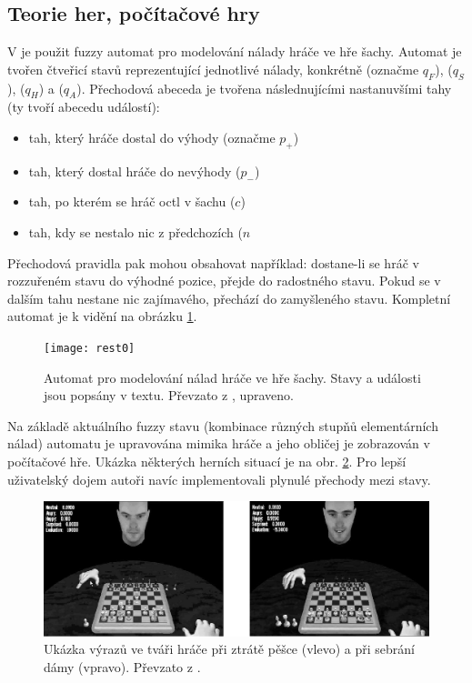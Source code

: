 \documentclass[a4paper,10pt]{article}
\begin{document}
\subsection{Teorie her, počítačové hry}
V \cite{AlvJoaCru-FuStMaAppEmoModEleGamCha} je použit fuzzy automat pro modelování nálady hráče ve hře šachy. Automat je tvořen čtveřicí stavů reprezentující jednotlivé  nálady, konkrétně  (označme $q_F$),  ($q_S$),  ($q_H$) a  ($q_A$). Přechodová abeceda je tvořena následnujícími nastanuvšími tahy (ty tvoří abecedu událostí):
\begin{itemize}
 \item tah, který hráče dostal do výhody (označme $p_{+}$)
 \item tah, který dostal hráče do nevýhody ($p_{-}$)
 \item tah, po kterém se hráč octl v šachu ($c$)
 \item tah, kdy se nestalo nic z předchozích ($n$
\end{itemize}

Přechodová pravidla pak mohou obsahovat například: dostane-li se hráč v rozzuřeném stavu do výhodné pozice, přejde do radostného stavu. Pokud se v dalším tahu nestane nic zajímavého, přechází do zamyšleného stavu. Kompletní automat je k vidění na obrázku \ref{img:ChessEmosFA}.

\begin{figure}
 \centering
 \texttt{[image: rest0]}
 
 \caption{Automat pro modelování nálad hráče ve hře šachy. Stavy a události jsou popsány v textu. Převzato z \cite{AlvJoaCru-FuStMaAppEmoModEleGamCha}, upraveno.}
 \label{img:ChessEmosFA}
\end{figure}

Na základě aktuálního fuzzy stavu (kombinace různých stupňů elementárních nálad) automatu je upravována mimika hráče a jeho obličej je zobrazován v počítačové hře. Ukázka některých herních situací je na obr. \ref{img:ChessEmosScreens}. Pro lepší uživatelský dojem autoři navíc implementovali plynulé přechody mezi stavy.

\begin{figure}
 \centering
 \includegraphics[width=\textwidth]{chess-emos-screens}
 
 \caption{Ukázka výrazů ve tváři hráče při ztrátě pěšce (vlevo) a při sebrání dámy (vpravo). Převzato z \cite{AlvJoaCru-FuStMaAppEmoModEleGamCha}.} \label{img:ChessEmosScreens}
\end{figure}
\end{document}
